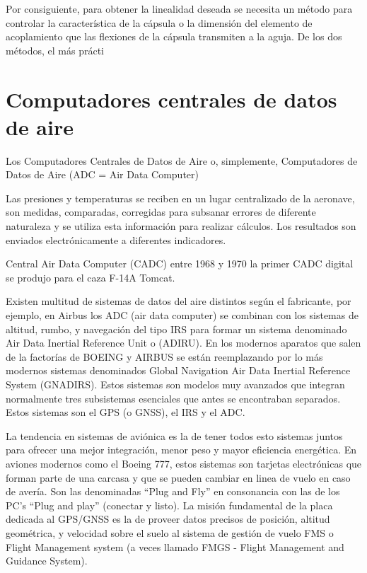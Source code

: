 \documentclass[a4paper,12pt,twoside]{article}
\begin{document}
Por consiguiente, para obtener la linealidad deseada se necesita un método para controlar la característica de la cápsula o la dimensión del elemento de acoplamiento que las flexiones de la cápsula transmiten a la aguja. De los dos métodos, el más prácti




\newpage

\section{Computadores centrales de datos de aire}
\label{sec:Computadores.centrales.de.datos.de.aire}

Los Computadores Centrales de Datos de Aire o, simplemente, Computadores de Datos de Aire
 (ADC = Air Data Computer) 

Las presiones y temperaturas se reciben en un lugar centralizado de la aeronave, son medidas, comparadas,
corregidas para subsanar errores de diferente naturaleza y se utiliza esta informaci\'on
para realizar c\'alculos.
Los resultados son enviados electr\'onicamente a diferentes indicadores.

Central Air Data Computer (CADC) 
entre 1968 y 1970 la primer CADC digital se produjo para el caza F-14A Tomcat.

Existen multitud de sistemas de datos del aire distintos según el fabricante, por ejemplo, en
Airbus los ADC (air data computer) se combinan con los sistemas de altitud, rumbo, y
navegaci\'on del tipo IRS para formar un sistema denominado Air Data Inertial Reference
Unit o (ADIRU). En los modernos aparatos que salen de la factorías de BOEING y AIRBUS se
están reemplazando por lo más modernos sistemas denominados Global Navigation Air Data
Inertial Reference System (GNADIRS). Estos sistemas son modelos muy avanzados que
integran normalmente tres subsistemas esenciales que antes se encontraban separados. Estos
sistemas son el GPS (o GNSS), el IRS y el ADC.

La tendencia en sistemas de avi\'onica es la de
tener todos esto sistemas juntos para ofrecer una mejor integraci\'on, menor peso y mayor
eficiencia energética. En aviones modernos como el Boeing 777, estos sistemas son tarjetas
electr\'onicas  que forman parte de una carcasa y que se
pueden cambiar en linea de vuelo en caso de avería. Son las denominadas ``Plug and Fly'' en
consonancia con las de los PC's ``Plug and play'' (conectar y listo). La misi\'on fundamental de la
placa dedicada al GPS/GNSS es la de proveer datos precisos de posici\'on, altitud geométrica, y
velocidad sobre el suelo al sistema de gesti\'on de vuelo FMS o Flight Management system (a
veces llamado FMGS - Flight Management and Guidance System).



\newpage



%
%

\end{document}
